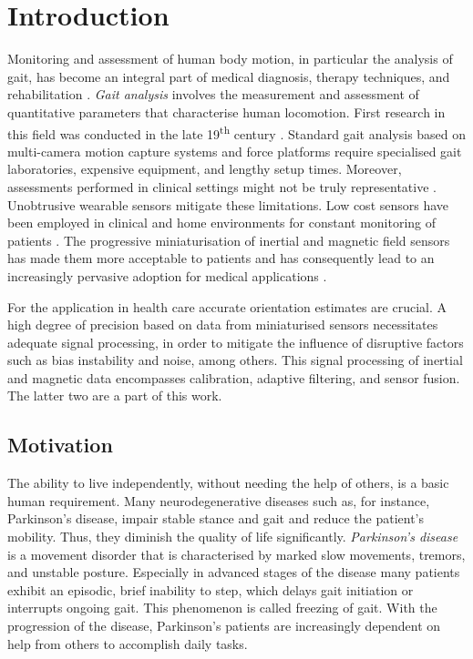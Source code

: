 \chapter{Introduction}
\label{ch:Introduction}

Monitoring and assessment of human body motion, in particular the analysis of gait, has become an integral part of medical diagnosis, therapy techniques, and rehabilitation \cite{tao_gait_2012}. \emph{Gait analysis} involves the measurement and assessment of quantitative parameters that characterise human locomotion. First research in this field was conducted in the late 19\textsuperscript{th} century \cite{tao_gait_2012}. Standard gait analysis based on multi-camera motion capture systems and force platforms require specialised gait laboratories, expensive equipment, and lengthy setup times. Moreover, assessments performed in clinical settings might not be truly representative \cite{bonato_advances_2005}. Unobtrusive wearable sensors mitigate these limitations. Low cost sensors have been employed in clinical and home environments for constant monitoring of patients \cite{godfrey_direct_2008}. The progressive miniaturisation of inertial and magnetic field sensors has made them more acceptable to patients and has consequently lead to an increasingly pervasive adoption for medical applications \cite{wee_soon_ambulatory_2008}.

For the application in health care accurate orientation estimates are crucial. A high degree of precision based on data from miniaturised sensors necessitates adequate signal processing, in order to mitigate the influence of disruptive factors such as bias instability and noise, among others. This signal processing of inertial and magnetic data encompasses calibration, adaptive filtering, and sensor fusion. The latter two are a part of this work.

\section{Motivation}

The ability to live independently, without needing the help of others, is a basic human requirement. Many neurodegenerative diseases such as, for instance, Parkinson's disease, impair stable stance and gait and reduce the patient's mobility. Thus, they diminish the quality of life significantly. \emph{Parkinson's disease} is a movement disorder that is characterised by marked slow movements, tremors, and unstable posture. Especially in advanced stages of the disease many patients exhibit an episodic, brief inability to step, which delays gait initiation or interrupts ongoing gait. This phenomenon is called freezing of gait. With the progression of the disease, Parkinson's patients are increasingly dependent on help from others to accomplish daily tasks.

